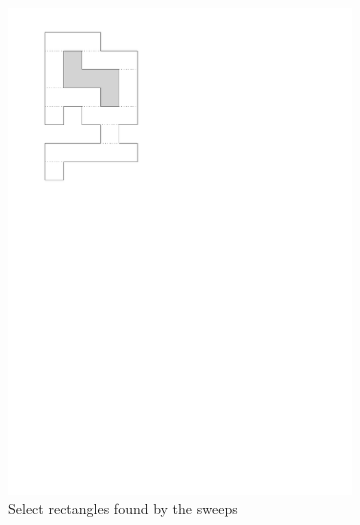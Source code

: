 \documentclass[english,gradu]{tktltiki2018}
\begin{document}
\begin{figure}
\begin{subfigure}[t]{0.15\textwidth}
		\includegraphics[width=\textwidth,page=5]{fig/light2d}
		\caption{Select rectangles found by the sweeps}\label{fig:light2d:sel1}
	\end{subfigure}
	\hfil
	\begin{subfigure}[t]{0.15\textwidth}\centering

\end{subfigure}
\end{figure}
\end{document}
